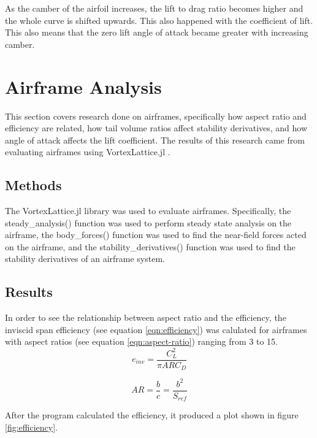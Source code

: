 \documentclass{journal}
\begin{document}
	As the camber of the airfoil increases, the lift to drag ratio becomes higher and the whole curve is shifted upwards. This also happened with the coefficient of lift. This also means that the zero lift angle of attack became greater with increasing camber.\\
	
	\section{Airframe Analysis}
	
	This section covers research done on airframes, specifically how aspect ratio and efficiency are related, how tail volume ratios affect stability derivatives, and how angle of attack affects the lift coefficient. The results of this research came from evaluating airframes using VortexLattice.jl \cite{McDonnell-Ning}.\\
	
	\subsection{Methods}
	The VortexLattice.jl library \cite{McDonnell-Ning} was used to evaluate airframes. Specifically, the steady\_analysis() function was used to perform steady state analysis on the airframe, the body\_forces() function was used to find the near-field forces acted on the airframe, and the stability\_derivatives() function was used to find the stability derivatives of an airframe system.

	\subsection{Results}
	
	In order to see the relationship between aspect ratio and the efficiency, the inviscid span efficiency (see equation \ref{eqn:efficiency}) was calulated for airframes with aspect ratios (see equation \ref{eqn:aspect-ratio}) ranging from 3 to 15.\\
	
	\begin{equation}
		e_{inv} = \frac{C_L^2}{\pi{ARC_D}}
		\label{eqn:efficiency}
	\end{equation}
	
	\begin{equation}
		AR = \frac{b}{c} = \frac{b^2}{S_{ref}}
		\label{eqn:aspect-ratio}
	\end{equation}
	
	After the program calculated the efficiency, it produced a plot shown in figure \ref{fig:efficiency}.\\
	
\end{document}
